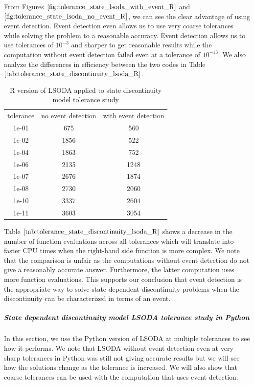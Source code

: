From Figures $\ref{fig:tolerance_state_lsoda_with_event_R}$ and $\ref{fig:tolerance_state_lsoda_no_event_R}$, we can see the clear advantage of using event detection. Event detection even allows us to use very coarse tolerances while solving the problem to a reasonable accuracy. Event detection allows us to use tolerances of $10^{-3}$ and sharper to get reasonable results while the computation without event detection failed even at a tolerance of $10^{-13}$. We also analyze the differences in efficiency between the two codes in Table $\ref{tab:tolerance_state_discontinuity_lsoda_R}$.

\begin{table}[h]
\caption {R version of LSODA applied to state discontinuity model tolerance study} \label{tab:tolerance_state_discontinuity_lsoda_R} 
\begin{center}
\begin{tabular}{ c c c }
tolerance & no event detection & with event detection \\
1e-01 & 675 & 560 \\
1e-02 & 1856 & 522 \\
1e-04 & 1863 & 752 \\
1e-06 & 2135 & 1248 \\
1e-07 & 2676 & 1874 \\
1e-08 & 2730 & 2060 \\
1e-10 & 3337 & 2604 \\
1e-11 & 3603 & 3054 \\
\end{tabular}
\end{center}
\end{table}

Table $\ref{tab:tolerance_state_discontinuity_lsoda_R}$ shows a decrease in the number of function evaluations across all tolerances which will translate into faster CPU times when the right-hand side function is more complex. We note that the comparison is unfair as the computations without event detection do not give a reasonably accurate answer. Furthermore, the latter computation uses more function evaluations. This supports our conclusion that event detection is the appropriate way to solve state-dependent discontinuity problems when the discontinuity can be characterized in terms of an event.

\subparagraph{State dependent discontinuity model LSODA tolerance study in Python}
In this section, we use the Python version of LSODA at multiple tolerances to see how it performs. We note that LSODA without event detection even at very sharp tolerances in Python was still not giving accurate results but we will see how the solutions change as the tolerance is increased. We will also show that coarse tolerances can be used with the computation that uses event detection. 

